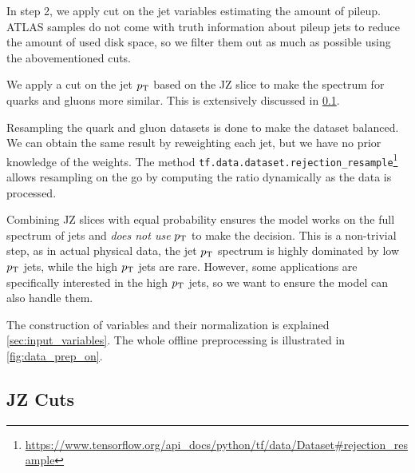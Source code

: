 In step 2, we apply cut on the jet variables estimating the amount of pileup.
ATLAS \MC samples do not come with truth information about pileup jets to reduce the amount of used disk space, so we filter them out as much as possible using the abovementioned cuts.

We apply a cut on the jet $p_\text{T}$ based on the JZ slice to make the spectrum for quarks and gluons more similar.
This is extensively discussed in \cref{sec:jet_pt_cuts}.

Resampling the quark and gluon datasets is done to make the dataset balanced.
We can obtain the same result by reweighting each jet, but we have no prior knowledge of the weights.
The method \texttt{tf.data.dataset.rejection\_resample}\footnote{\url{https://www.tensorflow.org/api_docs/python/tf/data/Dataset\#rejection\_resample}} allows resampling on the go by computing the ratio dynamically as the data is processed.

Combining JZ slices with equal probability ensures the model works on the full spectrum of jets and \emph{does not use} $p_\text{T}$ to make the decision.
This is a non-trivial step, as in actual physical data, the jet $p_\text{T}$ spectrum is highly dominated by low $p_\text{T}$ jets, while the high $p_\text{T}$ jets are rare. 
However, some applications are specifically interested in the high $p_\text{T}$ jets, so we want to ensure the model can also handle them.

The construction of variables and their normalization is explained \cref{sec:input_variables}.
The whole offline preprocessing is illustrated in \cref{fig:data_prep_on}.


\subsection{JZ Cuts}
\label{sec:jet_pt_cuts}

